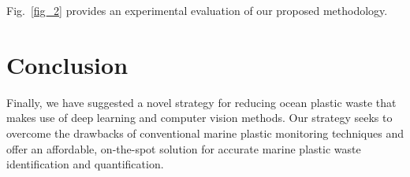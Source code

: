 \documentclass[lettersize,journal]{IEEEtran}
\begin{document}
Fig.~\ref{fig_2} provides an experimental evaluation of our proposed methodology.


\section{Conclusion}
Finally, we have suggested a novel strategy for reducing ocean plastic waste that makes use of deep learning and computer vision methods. Our strategy seeks to overcome the drawbacks of conventional marine plastic monitoring techniques and offer an affordable, on-the-spot solution for accurate marine plastic waste identification and quantification.
\end{document}

